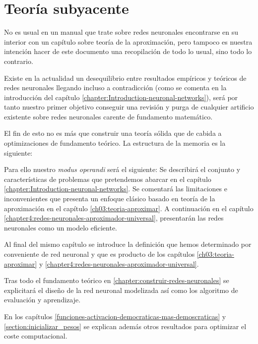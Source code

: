 
\part{Teoría subyacente}

No es usual en un manual que trate sobre redes neuronales encontrarse en su interior con un 
capítulo sobre teoría de la aproximación, pero tampoco es nuestra intención
hacer de este documento una recopilación de todo lo usual, sino todo lo contrario.

Existe en la actualidad un desequilibrio entre resultados empíricos y teóricos de redes neuronales llegando incluso a contradicción (como se comenta en la introducción del capítulo \ref{chapter:Introduction-neuronal-networks}), será por tanto
nuestro primer objetivo conseguir una revisión y purga de cualquier artificio existente sobre redes neuronales carente de fundamento matemático. 

El fin de esto no es más que construir una teoría sólida que de cabida a 
optimizaciones de fundamento teórico. La estructura de la memoria es la siguiente: 


Para ello nuestro \textit{modus operandi} será el siguiente: 
Se describirá el conjunto y características de problemas que pretendemos abarcar  en el capítulo \ref{chapter:Introduction-neuronal-networks}. 
Se comentará las limitaciones e inconvenientes que presenta un enfoque clásico 
basado en teoría de la aproximación en el capítulo \ref{ch03:teoria-aproximar}.
A continuación en el capítulo \ref{chapter4:redes-neuronales-aproximador-universal}, 
presentarán las redes neuronales como un modelo eficiente.
 
Al final del mismo capítulo se introduce la definición que hemos determinado por conveniente de red neuronal y que es producto de los capítulos 
\ref{ch03:teoria-aproximar} y \ref{chapter4:redes-neuronales-aproximador-universal}.
 
Tras todo el fundamento teórico en \ref{chapter:construir-redes-neuronales} se explicitará el diseño de la red neuronal modelizada así como los algoritmo de evaluación y aprendizaje.

En los capítulos \ref{funciones-activacion-democraticas-mas-demoscraticas} y \ref{section:inicializar_pesos} se explican además otros resultados para optimizar el coste computacional.